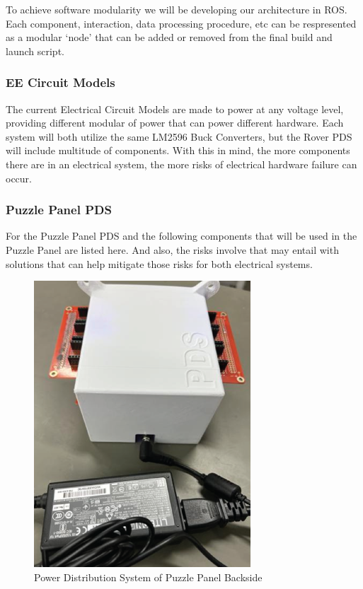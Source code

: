 \documentclass[a4paper, 10pt]{article}
\begin{document}
 	To achieve software modularity we will be developing our architecture in ROS. Each component, interaction, data processing procedure, etc can be respresented as a modular `node' that can be added or removed from the final build and launch script.
 		
 		\subsubsection{EE Circuit Models}
 		
 		The current Electrical Circuit Models are made to power at any voltage level, providing different modular of power that can power different hardware. Each system will both utilize the same LM2596 Buck Converters, but the Rover PDS will include multitude of components. With this in mind, the more components there are in an electrical system, the more risks of electrical hardware failure can occur. 
 		
 		\subsubsection*{Puzzle Panel PDS}

	For the Puzzle Panel PDS and the following components that will be used in the Puzzle Panel are listed here. And also, the risks involve that may entail with solutions that can help mitigate those risks for both electrical systems. 

\begin{figure} [h]
			\centering
			\includegraphics[scale=0.375]{Photos/Puzzle Panel PDS backside}
			\caption{Power Distribution System of Puzzle Panel Backside}
		\end{figure}
		
\end{document}
